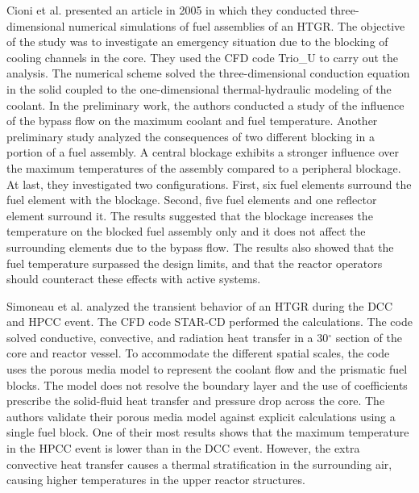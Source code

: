 \documentclass[11pt,letterpaper]{article}
\begin{document}
Cioni et al. \cite{cioni_3d_2006} presented an article in 2005 in which they conducted three-dimensional numerical simulations of fuel assemblies of an \gls{HTGR}.
The objective of the study was to investigate an emergency situation due to the blocking of cooling channels in the core.
They used the \gls{CFD} code Trio_U \cite{bieder_priceles_2000} to carry out the analysis.
The numerical scheme solved the three-dimensional conduction equation in the solid coupled to the one-dimensional thermal-hydraulic modeling of the coolant.
In the preliminary work, the authors conducted a study of the influence of the bypass flow on the maximum coolant and fuel temperature.
Another preliminary study analyzed the consequences of two different blocking in a portion of a fuel assembly.
A central blockage exhibits a stronger influence over the maximum temperatures of the assembly compared to a peripheral blockage.
At last, they investigated two configurations.
First, six fuel elements surround the fuel element with the blockage.
Second, five fuel elements and one reflector element surround it.
The results suggested that the blockage increases the temperature on the blocked fuel assembly only and it does not affect the surrounding elements due to the bypass flow.
The results also showed that the fuel temperature surpassed the design limits, and that the reactor operators should counteract these effects with active systems.

Simoneau et al. \cite{simoneau_three-dimensional_2007} analyzed the transient behavior of an \gls{HTGR} during the \gls{DCC} and \gls{HPCC} event.
The CFD code STAR-CD \cite{computational_dynamics_limited_star-cd_2004} performed the calculations.
The code solved conductive, convective, and radiation heat transfer in a 30$^{\circ}$ section of the core and reactor vessel.
To accommodate the different spatial scales, the code uses the porous media model to represent the coolant flow and the prismatic fuel blocks.
The model does not resolve the boundary layer and the use of coefficients prescribe the solid-fluid heat transfer and pressure drop across the core.
The authors validate their porous media model against explicit calculations using a single fuel block.
One of their most results shows that the maximum temperature in the \gls{HPCC} event is lower than in the \gls{DCC} event.
However, the extra convective heat transfer causes a thermal stratification in the surrounding air, causing higher temperatures in the upper reactor structures.
\end{document}
